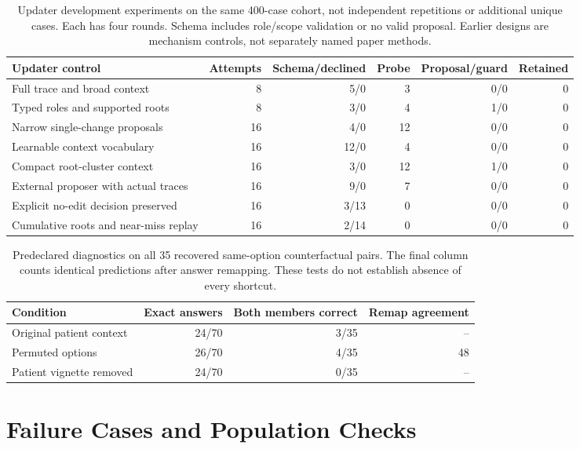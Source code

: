 \begin{table}[t]\centering\small
\setlength{\tabcolsep}{4pt}
\caption{Updater development experiments on the same 400-case cohort, not independent repetitions or additional unique cases. Each has four rounds. Schema includes role/scope validation or no valid proposal. Earlier designs are mechanism controls, not separately named paper methods.}
\label{tab:updates}
\begin{tabular}{@{}p{4.7cm}rrrrr@{}}\toprule
Updater control & Attempts & Schema/declined & Probe & Proposal/guard & Retained\\\midrule
Full trace and broad context & 8 & 5/0 & 3 & 0/0 & 0\\
Typed roles and supported roots & 8 & 3/0 & 4 & 1/0 & 0\\
Narrow single-change proposals & 16 & 4/0 & 12 & 0/0 & 0\\
Learnable context vocabulary & 16 & 12/0 & 4 & 0/0 & 0\\
Compact root-cluster context & 16 & 3/0 & 12 & 1/0 & 0\\
External proposer with actual traces & 16 & 9/0 & 7 & 0/0 & 0\\
Explicit no-edit decision preserved & 16 & 3/13 & 0 & 0/0 & 0\\
Cumulative roots and near-miss replay & 16 & 2/14 & 0 & 0/0 & 0\\
\bottomrule\end{tabular}
\end{table}
\begin{table}[t]\centering\small
\setlength{\tabcolsep}{4pt}
\caption{Predeclared diagnostics on all 35 recovered same-option counterfactual pairs. The final column counts identical predictions after answer remapping. These tests do not establish absence of every shortcut.}
\label{tab:shortcuts}
\begin{tabular}{@{}lrrr@{}}\toprule
Condition & Exact answers & Both members correct & Remap agreement\\\midrule
Original patient context & 24/70 & 3/35 & --\\
Permuted options & 26/70 & 4/35 & 48\\
Patient vignette removed & 24/70 & 0/35 & --\\
\bottomrule\end{tabular}
\end{table}
\section{Failure Cases and Population Checks}\label{app:cases}

